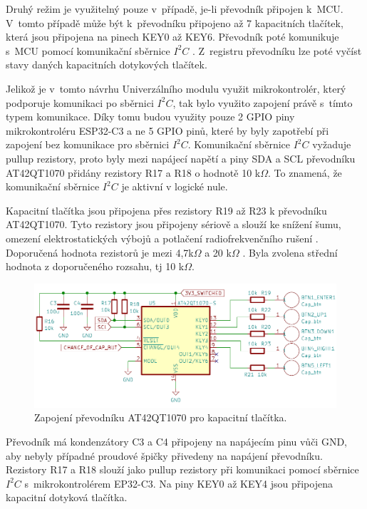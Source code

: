 Druhý režim je využitelný pouze v~případě, je-li převodník připojen k~MCU. V~tomto případě může být k~převodníku připojeno až 7 kapacitních tlačítek, 
která jsou připojena na pinech KEY0 až KEY6. Převodník poté komunikuje s~MCU pomocí komunikační sběrnice $I^2C$ \cite{conv_cap_but_AT42QT1070_dtsh}. 
Z~registru převodníku lze poté vyčíst stavy daných kapacitních dotykových tlačítek. 

Jelikož je v~tomto návrhu Univerzálního modulu využit mikrokontrolér, který podporuje komunikaci po sběrnici $I^2C$, tak bylo využito zapojení právě s~tímto typem 
komunikace. Díky tomu budou využity pouze 2 GPIO piny mikrokontroléru ESP32-C3 a ne 5 GPIO pinů, které by byly zapotřebí při zapojení bez komunikace pro
sběrnici $I^2C$. Komunikační sběrnice $I^2C$ vyžaduje pullup rezistory, proto byly mezi napájecí napětí a piny SDA a SCL převodníku AT42QT1070 
přidány rezistory R17 a R18 o hodnotě 10 k$\Omega$. To znamená, že komunikační sběrnice $I^2C$ je aktivní v logické nule. 

Kapacitní tlačítka jsou připojena přes rezistory R19 až R23 k převodníku AT42QT1070. Tyto rezistory jsou připojeny sériově a slouží ke snížení šumu, 
omezení elektrostatických výbojů a potlačení radiofrekvenčního rušení \cite{conv_cap_but_AT42QT1070_dtsh}. Doporučená hodnota rezistorů je mezi 
4,7k$\Omega$ a 20 k$\Omega$ \cite{conv_cap_but_AT42QT1070_dtsh}. Byla zvolena střední hodnota z doporučeného rozsahu, tj 10 k$\Omega$.

\begin{figure}[!h]
  \begin{center}
    \includegraphics[scale=0.55]{obrazky/AT42QT1070.png}
  \end{center}
  \caption[Zapojení převodníku AT42QT1070 pro kapacitní tlačítka]{Zapojení převodníku AT42QT1070 pro kapacitní tlačítka.}
\end{figure}

Převodník má kondenzátory C3 a C4 připojeny na napájecím pinu vůči GND, aby nebyly případné proudové špičky přivedeny na napájení převodníku. Rezistory
R17 a R18 slouží jako pullup rezistory při komunikaci pomocí sběrnice $I^2C$ s~mikrokontrolérem EP32-C3. Na piny KEY0 až KEY4 jsou připojena kapacitní 
dotyková tlačítka. 

